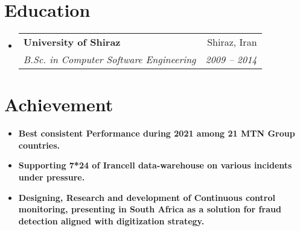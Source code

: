\documentclass[letterpaper,11pt]{article}
\makeatletter
\newcommand{\resumeSubheading}[4]{
  \vspace{-1pt}\item
    \begin{tabular*}{0.97\textwidth}[t]{l@{\extracolsep{\fill}}r}
      \textbf{#1} & #2 \\
      \textit{\small#3} & \textit{\small #4} \\
    \end{tabular*}\vspace{-5pt}
}
\newcommand{\resumeSubHeadingListStart}{\begin{itemize}[leftmargin=*]}
\newcommand{\resumeSubHeadingListEnd}{\end{itemize}}
\makeatother
\begin{document}
\section{Education}
  \resumeSubHeadingListStart
    \resumeSubheading
      {University of Shiraz}{Shiraz, Iran}
      {B.Sc. in Computer Software Engineering}{2009 -- 2014}
  \resumeSubHeadingListEnd
\section{Achievement}
  \resumeSubHeadingListStart
    \item{\textbf{Best consistent Performance during 2021 among 21 MTN Group countries.}}
    \item{\textbf{Supporting 7*24 of Irancell data-warehouse on various incidents under pressure.}}
    \item{\textbf{Designing, Research and development of Continuous control monitoring, presenting in South Africa as a solution for fraud detection aligned with digitization strategy.}}
    \resumeSubHeadingListEnd
\end{document}
